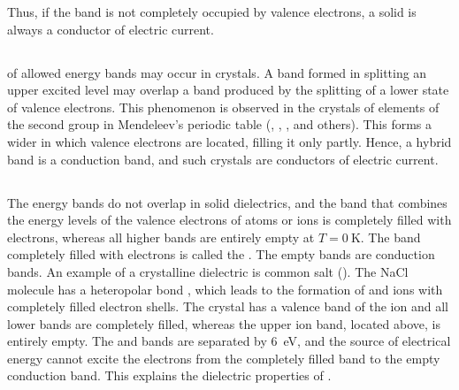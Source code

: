 Thus, if the band is not completely occupied by valence electrons, a solid is always a conductor of electric current.

\subsection{}\label{41.9.3} 

 of allowed energy bands may occur in crystals. A band formed in splitting an upper excited level may overlap a band produced by the splitting of a lower state of valence electrons. This phenomenon is observed in the crystals of elements of the second group in Mendeleev's periodic table (, , ,  and others). This forms a wider  in which valence electrons are located, filling it only partly. Hence, a hybrid band is a conduction band, and such crystals are conductors of electric current.

\subsection{}\label{41.9.4}

The energy bands do not overlap in solid dielectrics, and the band that combines the energy levels of the valence electrons of atoms or ions is completely filled with electrons, whereas all higher bands are entirely empty at $T = \SI{0}{\kelvin}$. The band completely filled with electrons is called the . The empty bands are conduction bands. An example of a crystalline dielectric is common salt (). The NaCl molecule has a heteropolar bond , which leads to the formation of  and  ions with completely filled electron shells. The  crystal has a valence band of the  ion and all lower bands are completely filled, whereas the upper  ion band, located above, is entirely empty. The  and  bands are separated by \SI{6}{\electronvolt}, and the source of electrical energy cannot excite the electrons from the completely filled  band to the empty  conduction band. This explains the dielectric properties of .

